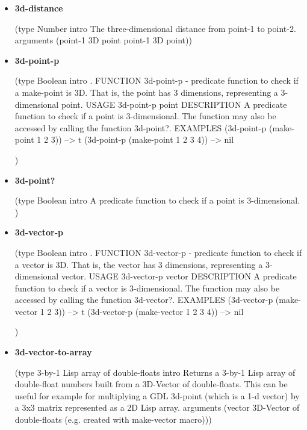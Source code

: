 \documentclass [11pt]{book}
\begin{document}
\label{subsec:functionandmacrodefinitions}



\begin{itemize}

\item {}
\label{prim:3d-distance}
\textbf{3d-distance}

(type Number intro  The three-dimensional distance from
point-1 to point-2.
 arguments (point-1 3D point point-1 3D point))



\item {}
\label{prim:3d-point-p}
\textbf{3d-point-p}

(type Boolean intro .
 FUNCTION 
3d-point-p - predicate function to check if a make-point is 3D.  That is, the
point has 3 dimensions, representing a 3-dimensional point.
 USAGE 
3d-point-p point
 DESCRIPTION 
A predicate function to check if a point is 3-dimensional.
The function may also be accessed by calling the function 3d-point?.
 EXAMPLES 
(3d-point-p (make-point 1 2 3))
--> t
(3d-point-p (make-point 1 2 3 4))
--> nil

)



\item {}
\label{prim:3d-point?}
\textbf{3d-point?}

(type Boolean intro
  A predicate function to check if a point is 3-dimensional.
)



\item {}
\label{prim:3d-vector-p}
\textbf{3d-vector-p}

(type Boolean intro .
 FUNCTION 
3d-vector-p - predicate function to check if a vector is 3D.  That is, the
vector has 3 dimensions, representing a 3-dimensional vector.
 USAGE 
3d-vector-p vector
 DESCRIPTION 
A predicate function to check if a vector is 3-dimensional.
The function may also be accessed by calling the function 3d-vector?.
 EXAMPLES 
(3d-vector-p (make-vector 1 2 3))
--> t
(3d-vector-p (make-vector 1 2 3 4))
--> nil

)



\item {}
\label{prim:3d-vector-to-array}
\textbf{3d-vector-to-array}

(type 3-by-1 Lisp array of double-floats intro
  Returns a 3-by-1 Lisp array of double-float numbers
built from a 3D-Vector of double-floats. This can be useful for example for multiplying
a GDL 3d-point (which is a 1-d vector) by a 3x3 matrix represented as a 2D Lisp array.
 arguments
 (vector 3D-Vector of double-floats (e.g. created with make-vector macro)))




\end{itemize}
\end{document}
